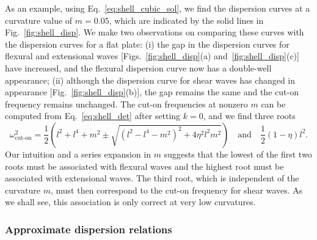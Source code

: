 As an example, using Eq.~\eqref{eq:shell_cubic_sol}, we find the dispersion curves at a curvature value of $m = 0.05$, which are indicated by the solid lines in Fig.~\ref{fig:shell_disp}.
We make two observations on comparing these curves with the dispersion curves for a flat plate:
(i) the gap in the dispersion curves for flexural and extensional waves [Figs.~\ref{fig:shell_disp}(a) and~\ref{fig:shell_disp}(c)] have increased, and the flexural dispersion curve now has a double-well appearance;
(ii) although the dispersion curve for shear waves has changed in appearance [Fig.~\ref{fig:shell_disp}(b)], the gap remains the same and the cut-on frequency remains unchanged.
The cut-on frequencies at nonzero $m$ can be computed from Eq.~\eqref{eq:shell_det} after setting $k = 0$, and we find three roots
%
\begin{equation}
  \omega^{2}_{\text{cut-on}} =
    \frac{1}{2}\left(l^{2} + l^{4} + m^{2} \pm \sqrt{\left(l^{2} - l^{4} - m^{2}\right)^{2} + 4\eta^{2}l^{2}m^{2}}\right)
    \quad\text{and}\quad
    \frac{1}{2}(1-\eta)l^{2}.
    \label{eq:shell_cuton}
\end{equation}
%
Our intuition and a series expansion in $m$ suggests that the lowest of the first two roots must be associated with flexural waves and the highest root must be associated with extensional waves.
The third root, which is independent of the curvature $m$, must then correspond to the cut-on frequency for shear waves.
As we shall see, this association is only correct at very low curvatures.

\subsubsection*{Approximate dispersion relations}

